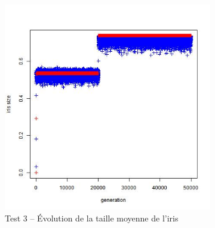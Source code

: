 \documentclass[a4paper,11pt]{article}
\begin{document}
%


\begin{figure}
\centering
\begin{subfigure}{.5\textwidth}
  \centering
\includegraphics[width=1\linewidth]{1487424573992_evolution_average_iris_size.jpeg}
\caption{Test 3 – Évolution de la taille moyenne de l'iris}
\label{fig:sub33}
\end{subfigure}%
\begin{subfigure}{.5\textwidth}
  \centering

\end{subfigure}
\end{figure}
\end{document}
